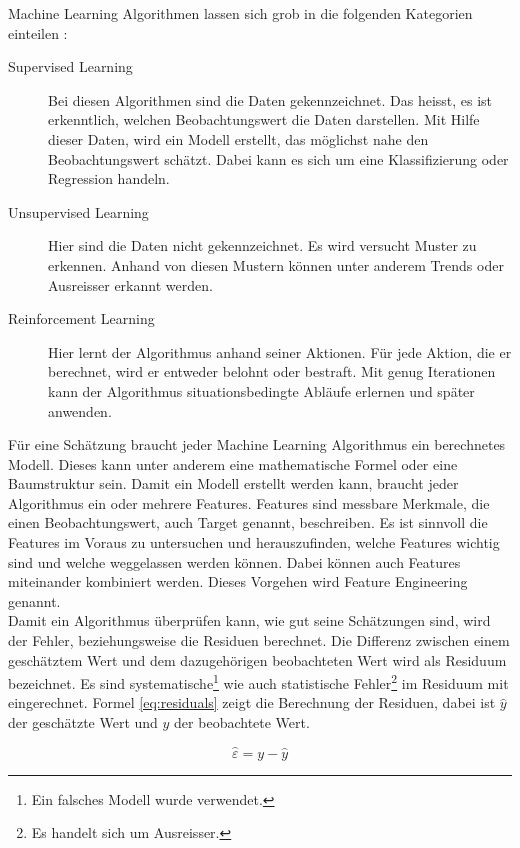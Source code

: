 \begin{samepage}
Machine Learning Algorithmen lassen sich grob in die folgenden Kategorien einteilen \cite{super_unsuper}:
\begin{description}
  \item[Supervised Learning]	Bei diesen Algorithmen sind die Daten gekennzeichnet. Das heisst, es ist erkenntlich, welchen Beobachtungswert die Daten darstellen. Mit Hilfe dieser Daten, wird ein Modell erstellt, das möglichst nahe den Beobachtungswert schätzt. Dabei kann es sich um eine Klassifizierung oder Regression handeln.
  \item[Unsupervised Learning] Hier sind die Daten nicht gekennzeichnet. Es wird versucht Muster zu erkennen. Anhand von diesen Mustern können unter anderem Trends oder Ausreisser erkannt werden.
  \item[Reinforcement Learning] Hier lernt der Algorithmus anhand seiner Aktionen. Für jede Aktion, die er berechnet, wird er entweder belohnt oder bestraft. Mit genug Iterationen kann der Algorithmus situationsbedingte Abläufe erlernen und später anwenden.
\end{description}
\end{samepage}

Für eine Schätzung braucht jeder Machine Learning Algorithmus ein berechnetes Modell. Dieses kann unter anderem eine mathematische Formel oder eine Baumstruktur sein. Damit ein Modell erstellt werden kann, braucht jeder Algorithmus ein oder mehrere Features. Features sind messbare Merkmale, die einen Beobachtungswert, auch Target genannt, beschreiben. Es ist sinnvoll die Features im Voraus zu untersuchen und herauszufinden, welche Features wichtig sind und welche weggelassen werden können. Dabei können auch Features miteinander kombiniert werden. Dieses Vorgehen wird Feature Engineering genannt.\\[2ex]
%
Damit ein Algorithmus überprüfen kann, wie gut seine Schätzungen sind, wird der Fehler, beziehungsweise die Residuen berechnet. Die Differenz zwischen einem geschätztem Wert und dem dazugehörigen beobachteten Wert wird als Residuum bezeichnet. Es sind systematische\footnote{Ein falsches Modell wurde verwendet.} wie auch statistische Fehler\footnote{Es handelt sich um Ausreisser.} im Residuum mit eingerechnet. Formel \eqref{eq:residuals} zeigt die Berechnung der Residuen, dabei ist $\hat{y}$ der geschätzte Wert und $y$ der beobachtete Wert.

\begin{equation}
\label{eq:residuals}
\hat{\varepsilon} = y - \hat{y}
\end{equation}

